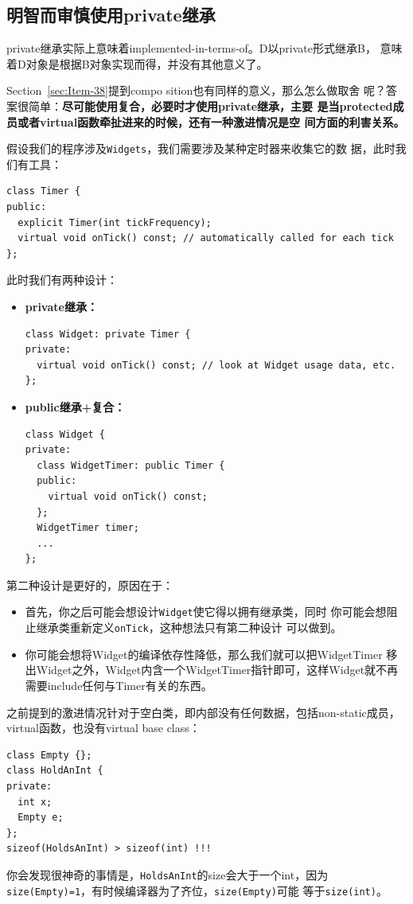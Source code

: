 \subsection{明智而审慎使用private继承}
\label{sec:Item-39}

private继承实际上意味着implemented-in-terms-of。D以private形式继承B，
意味着D对象是根据B对象实现而得，并没有其他意义了。

Section~\ref{sec:Item-38}提到compo sition也有同样的意义，那么怎么做取舍
呢？答案很简单：\textbf{尽可能使用复合，必要时才使用private继承，主要
  是当protected成员或者virtual函数牵扯进来的时候，还有一种激进情况是空
  间方面的利害关系。}

假设我们的程序涉及\texttt{Widgets}，我们需要涉及某种定时器来收集它的数
据，此时我们有工具：
\begin{verbatim}
class Timer {
public:
  explicit Timer(int tickFrequency);
  virtual void onTick() const; // automatically called for each tick
};
\end{verbatim}

此时我们有两种设计：
\begin{itemize}
\item \textbf{private继承：}
\begin{verbatim}
class Widget: private Timer {
private:
  virtual void onTick() const; // look at Widget usage data, etc.
};
\end{verbatim}
\item \textbf{public继承+复合：}
\begin{verbatim}
class Widget {
private:
  class WidgetTimer: public Timer {
  public:
    virtual void onTick() const;
  };
  WidgetTimer timer;
  ...
};
\end{verbatim}
\end{itemize}

第二种设计是更好的，原因在于：
\begin{itemize}
\item 首先，你之后可能会想设计\texttt{Widget}使它得以拥有继承类，同时
  你可能会想阻止继承类重新定义\texttt{onTick}，这种想法只有第二种设计
  可以做到。
\item 你可能会想将Widget的编译依存性降低，那么我们就可以把WidgetTimer
  移出Widget之外，Widget内含一个WidgetTimer指针即可，这样Widget就不再
  需要include任何与Timer有关的东西。
\end{itemize}

之前提到的激进情况针对于空白类，即内部没有任何数据，包括non-static成员，
virtual函数，也没有virtual base class：
\begin{verbatim}
class Empty {};
class HoldAnInt {
private:
  int x;
  Empty e;
};
sizeof(HoldsAnInt) > sizeof(int) !!!
\end{verbatim}
你会发现很神奇的事情是，\texttt{HoldsAnInt}的size会大于一个int，因为
\texttt{size(Empty)=1}，有时候编译器为了齐位，\texttt{size(Empty)}可能
等于\texttt{size(int)}。

